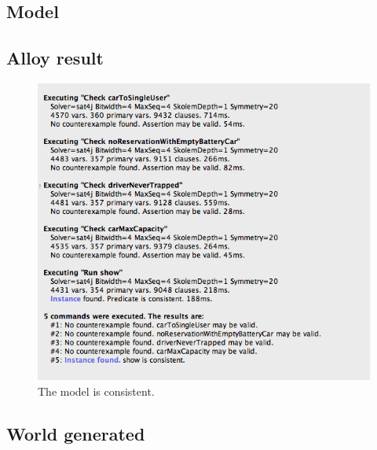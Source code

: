 \subsection{Model}

\subsection{Alloy result}
	\begin{figure}
		\includegraphics[width=\textwidth]{img/alloy_output.png}
		\caption{The model is consistent.}
		\label{figure 1}
	\end{figure}

\subsection{World generated}